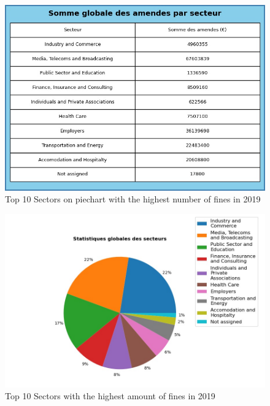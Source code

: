 \documentclass[12pt]{article}
\begin{document}
		
	\begin{multicols}{2}
	\begin{figure}
		[H]\centering\includegraphics[width=1.0\linewidth]{graphs/sector_data_year_fines}
		\caption{Top 10 Sectors on piechart with the highest number of fines in 2019}
	\end{figure}
	\begin{figure}
		[H]\centering\includegraphics[width=1\linewidth]{graphs/sector_data_year}
		\caption{Top 10 Sectors with the highest amount of fines in 2019}
	 \end{figure}
	
	\end{multicols}
\end{document}

